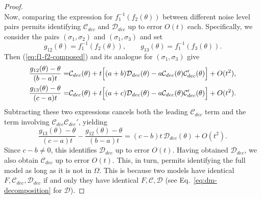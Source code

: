 \documentclass[si.tex]{subfiles}
\begin{document}
\begin{proof}
\begin{equation}
\end{equation}
Now, comparing the expression for $f_1^{-1}(f_2(\theta))$ between different noise level pairs permits identifying $\mathcal{C}_{dec}$ and $\mathcal{D}_{dec}$ up to error $O(t)$ each.
Specifically, we consider the pairs $(\sigma_1,\sigma_2)$ and $(\sigma_1,\sigma_3)$ and set
\[
g_{12}(\theta)=f_1^{-1}(f_2(\theta)), \qquad g_{13}(\theta)=f_1^{-1}(f_3(\theta)).
\]
Then (\ref{eq:f1-f2-composed}) and its analogue for $(\sigma_1,\sigma_3)$ give
\begin{align*}
\frac{g_{12}(\theta)-\theta}{(b-a)t}
=& \mathcal{C}_{dec}(\theta) + t\Bigl[(a+b)\mathcal{D}_{dec}(\theta)-a\mathcal{C}_{dec}(\theta)\mathcal{C}_{dec}'(\theta)\Bigr] + O(t^2), \\
\frac{g_{13}(\theta)-\theta}{(c-a)t}
=& \mathcal{C}_{dec}(\theta) + t\Bigl[(a+c)\mathcal{D}_{dec}(\theta)-a\mathcal{C}_{dec}(\theta)\mathcal{C}_{dec}'(\theta)\Bigr] + O(t^2).
\end{align*}
Subtracting these two expressions cancels both the leading $\mathcal{C}_{dec}$ term and the term involving $\mathcal{C}_{dec}\mathcal{C}_{dec}'$, yielding
\[
\frac{g_{13}(\theta)-\theta}{(c-a)t} - \frac{g_{12}(\theta)-\theta}{(b-a)t}
= (c-b)t\,\mathcal{D}_{dec}(\theta) + O(t^2).
\]
Since $c-b \neq 0$, this identifies $\mathcal{D}_{dec}$ up to error $O(t)$.
Having obtained $\mathcal{D}_{dec}$, we also obtain $\mathcal{C}_{dec}$ up to error $O(t)$.
This, in turn, permits identifying the full model as long as it is not in $\Omega$.
This is because two models have identical $F, \mathcal{C}_{dec}, \mathcal{D}_{dec}$ if and only they have identical $F, \mathcal{C}, \mathcal{D}$ (see Eq.~\ref{eq:dm-decomposition} for $\mathcal{D}$).



\end{proof}
\end{document}
